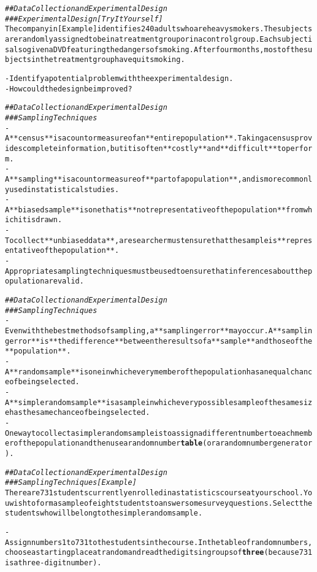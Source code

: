 \documentclass{article}\usepackage[]{graphicx}\usepackage[]{color}
\makeatletter
\newcommand{\hlcom}[1]{\textcolor[rgb]{0.678,0.584,0.686}{\textit{#1}}}%
\newcommand{\hlkwd}[1]{\textcolor[rgb]{0.737,0.353,0.396}{\textbf{#1}}}%
\newenvironment{kframe}{%
 \def\at@end@of@kframe{}%
 \ifinner\ifhmode%
  \def\at@end@of@kframe{\end{minipage}}%
  \begin{minipage}{\columnwidth}%
 \fi\fi%
 \def\FrameCommand##1{\hskip\@totalleftmargin \hskip-\fboxsep
 \colorbox{shadecolor}{##1}\hskip-\fboxsep
     \hskip-\linewidth \hskip-\@totalleftmargin \hskip\columnwidth}%
 \MakeFramed {\advance\hsize-\width
   \@totalleftmargin\z@ \linewidth\hsize
   \@setminipage}}%
 {\par\unskip\endMakeFramed%
 \at@end@of@kframe}
\newenvironment{knitrout}{}{} %
\makeatother
\begin{document}
\begin{knitrout}
\begin{kframe}
\begin{alltt}
\hlcom{## Data Collection and Experimental Design}
\hlcom{### Experimental Design [Try It Yourself]}
The company in [Example] identifies 240 adults who are heavy smokers. The subjects are randomly assigned to be in a treatment group or in a control group. Each subject is also given a DVD featuring the dangers of smoking. After four months, most of the subjects in the treatment group have quit smoking.

- Identify a potential problem with the experimental design.
- How could the design be improved?

\hlcom{## Data Collection and Experimental Design}
\hlcom{### Sampling Techniques}
- A **census** is a count or measure of an **entire population**. Taking a census provides complete information, but it is often **costly** and **difficult** to perform. 
- A **sampling** is a count or measure of **part of a population**, and is more commonly used in statistical studies. 
- A **biased sample** is one that is **not representative of the population** from which it is drawn.
- To collect **unbiased data**, a researcher must ensure that the sample is **representative of the population**.
- Appropriate sampling techniques must be used to ensure that inferences about the population are valid.

\hlcom{## Data Collection and Experimental Design}
\hlcom{### Sampling Techniques}
- Even with the best methods of sampling, a **sampling error** may occur. A **sampling error** is **the difference** between the results of a **sample** and those of the **population**.
- A **random sample** is one in which every member of the population has an equal chance of being selected.
- A **simple random sample** is a sample in which every possible sample of the same size has the same chance of being selected.
- One way to collect a simple random sample is to assign a different number to each member of the population and then use a random number \hlkwd{table} (or a random number generator).

\hlcom{## Data Collection and Experimental Design}
\hlcom{### Sampling Techniques [Example]}
There are 731 students currently enrolled in a statistics course at your school. You wish to form a sample of eight students to answer some survey questions. Select the students who will belong to the simple random sample.

- Assign numbers 1 to 731 to the students in the course. In the table of random numbers, choose a starting place at random and read the digits in groups of \hlkwd{three} (because 731 is a three-digit number).


\end{alltt}
\end{kframe}
\end{knitrout}
\end{document}
